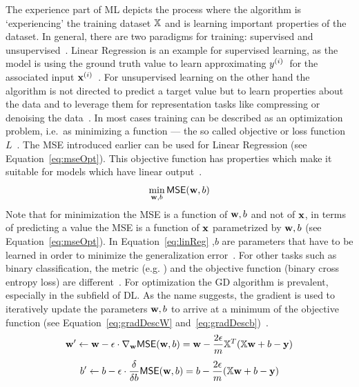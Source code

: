 The experience part of \ac{ML} depicts the process where the algorithm is `experiencing' the training
dataset $\mathbb{X}$ and is learning important properties of the dataset.
In general, there are two paradigms for training: supervised and
unsupervised~\citep{goodfellow_deep_2016}.
Linear Regression is an example for supervised learning, as the model is using the ground truth value
to learn approximating $y^{(i)}$\ for the associated input
$\textbf{x}^{(i)}$~\citep{alzubi_machine_2018,goodfellow_deep_2016}.
For unsupervised learning on the other hand the algorithm is not directed to predict a target
value but to learn properties about the data and to leverage them for representation tasks
like compressing or denoising the data~\citep{goodfellow_deep_2016,geron_hands-machine_2017}.
In most cases training can be described as an optimization problem, i.e.\ as minimizing a
function --- the so called objective or loss function $L$~\citep{goodfellow_deep_2016}.
The \ac{MSE} introduced earlier can be used for Linear Regression (see Equation~\ref{eq:mseOpt}).
This objective function has properties which make it suitable for models which have linear
output~\citep{goodfellow_deep_2016}.
\begin{equation}\label{eq:mseOpt}
    \min_{\textbf{w},b} \textsf{MSE}(\textbf{w},b)
\end{equation}
Note that for minimization the \ac{MSE} is a function of $\textbf{w},b$ and not of $\textbf{x}$, in terms of
predicting a value the \ac{MSE} is a function of $\textbf{x}$ parametrized by $\textbf{w},b$ (see
Equation~\ref{eq:mseOpt}).
In Equation~\ref{eq:linReg} \w,$b$ are parameters that have to be learned in order to minimize
the generalization error~\citep{james_introduction_2013,geron_hands-machine_2017}.
For other tasks such as binary classification, the metric (e.g. \fone) and the
objective function (binary cross entropy loss) are different~\citep{geron_hands-machine_2017,
ho_real-world-weight_2020}.
For optimization the \ac{GD} algorithm is prevalent, especially in the subfield of \ac{DL}.
As the name suggests, the gradient is used to iteratively update the parameters $\textbf{w},b$ to arrive
at a minimum of the objective function (see Equation~\ref{eq:gradDescW}
and~\ref{eq:gradDescb})~\citep{geron_hands-machine_2017}.
\begin{equation}\label{eq:gradDescW}
    \textbf{w}'\leftarrow \textbf{w}-\epsilon\cdot\nabla_{\textbf{w}} \textsf{MSE}(\textbf{w},b)
        = \textbf{w}-\frac{2\epsilon}{m}\mathbb{X}^T (\mathbb{X}\textbf{w}+b-\textbf{y})
\end{equation}
\begin{equation}\label{eq:gradDescb}
    b'\leftarrow b-\epsilon\cdot\frac{\delta}{\delta b} \textsf{MSE}(\textbf{w},b)
        = b-\frac{2\epsilon}{m}(\mathbb{X}\textbf{w}+b-\textbf{y})
\end{equation}

